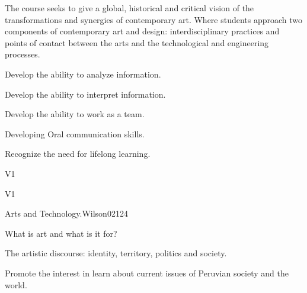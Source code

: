 \begin{syllabus}


\begin{justification}
The course seeks to give a global, historical and critical vision of the transformations and synergies of contemporary art. Where students approach two components of contemporary art and design: interdisciplinary practices and points of contact between the arts and the technological and engineering processes.
\end{justification}

\begin{goals}
    \item Develop the ability to analyze information.
    \item Develop the ability to interpret information.
    \item Develop the ability to work as a team.
    \item Developing Oral communication skills.
    \item Recognize the need for lifelong learning.   
\end{goals}

\begin{outcomes}{V1}
    \item {} %
    \item {} %
    \item {} %
    \item {} %
    \item {} %
\end{outcomes}

\begin{competences}{V1}
    \item {}
    \item {}
    \item {}
    \item {}
\end{competences}

\begin{unit}{Arts and Technology.}{}{Wilson02}{12}{4}
   \begin{topics}
      \item What is art and what is it for?
      \item The artistic discourse: identity, territory, politics and society.
   \end{topics}
   \begin{learningoutcomes}
      \item Promote the  interest in learn about current issues of Peruvian society and the world.
   \end{learningoutcomes}
\end{unit}


\end{syllabus}
